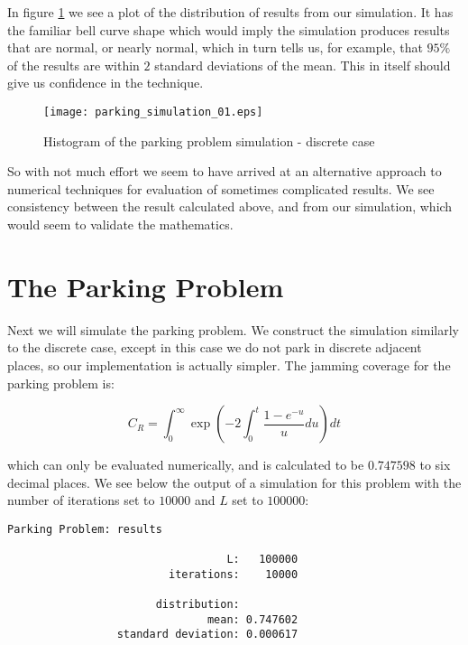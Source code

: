 In figure \ref{fig:ps1} we see a plot of the distribution 
of results from our simulation. It has the familiar bell 
curve shape which would imply the simulation produces 
results that are normal, or nearly normal, which in turn 
tells us, for example, that $95\%$ of the results are 
within $2$ standard deviations of the mean. This in itself 
should give us confidence in the technique. \bigskip

\begin{figure}[h!]
	\centering
	\texttt{[image: parking\_simulation\_01.eps]}
	\caption{Histogram of the parking problem simulation - discrete case}
	\label{fig:ps1}
\end{figure}\medskip

So with not much effort we seem to have arrived at an 
alternative approach to numerical techniques for 
evaluation of sometimes complicated results. We see 
consistency between the result calculated above, and 
from our simulation, which would seem to validate the 
mathematics. \bigskip









\section{The Parking Problem}

Next we will simulate the parking problem. We construct 
the simulation similarly to the discrete case, except 
in this case we do not park in discrete adjacent places, 
so our implementation is actually simpler. The jamming 
coverage for the parking problem is: \bigskip

\[
	C_R = \int_{0}^{\infty} \exp \left( -2 \int_{0}^{t} \frac{1 - e^{-u}}{u} du \right) dt
\]\medskip

which can only be evaluated numerically, and is 
calculated to be $0.747598$ to six decimal places. We 
see below the output of a simulation for this problem 
with the number of iterations set to $10000$ and $L$ 
set to $100000$: \bigskip

	\begin{lstlisting}[numbers=none]
                    Parking Problem: results

                                  L:   100000
                         iterations:    10000

                       distribution:
                               mean: 0.747602
                 standard deviation: 0.000617

	\end{lstlisting} \bigskip

